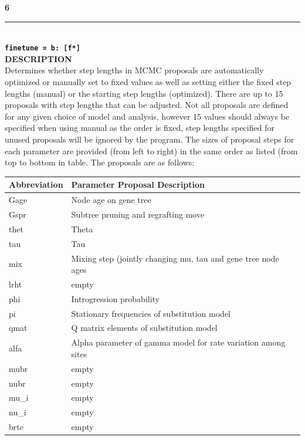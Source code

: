 \documentclass[a4paper]{book}
\numberwithin{equation}{section} \renewcommand{\baselinestretch}{0.55}
\begin{document}
\textbf{{\large 6}} \\
\noindent\rule{\textwidth}{0.8pt} \\
\textbf{{\Large \texttt{finetune = b: [f*]}}} \vspace{5pt}\\
\textbf{DESCRIPTION} \vspace{5pt}\\
Determines whether step lengths in MCMC proposals are automatically optimized or manually set to fixed values as well as setting either the fixed step lengths (manual) or the starting step lengths (optimized). There are up to
15 proposals with step lengths that can be adjusted. Not all proposals are defined for any given choice of model and analysis,
however 15 values should always be specified when using manual as the order is fixed, step lengths specified for unused proposals will be ignored by the program. The sizes of proposal steps for each parameter are provided (from left to right) in the same order as listed (from top to bottom in table.
The proposals are as follows:
\begin{table}[h]
\begin{tabular}{ll}
\hline
Abbreviation & Parameter Proposal Description \\ \hline
Gage & Node age on gene tree \\
Gspr & Subtree pruning and regrafting move \\
thet & Theta \\
tau &  Tau \\
mix &  Mixing step (jointly changing mu, tau and gene tree node ages\\
lrht & empty \\
phi &  Introgression probability\\
pi &  Stationary frequencies of substitution model\\
qmat &  Q matrix elements of substitution model \\
alfa &  Alpha parameter of gamma model for rate variation among sites \\
mubr &  empty \\
nubr &  empty \\
mu\_i &  empty \\
nu\_i &  empty \\
brte &  empty \\ \hline
\end{tabular}
\end{table}
\vspace{5pt}\\
\end{document}
